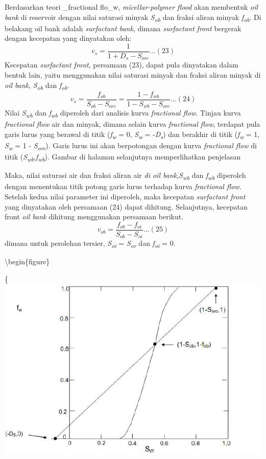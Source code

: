 \documentclass[
]{book}
\begin{document}
Berdasarkan teori \_fractional flo\_w, \emph{micellar-polymer flood} akan membentuk \emph{oil bank} di reservoir dengan nilai saturasi minyak \emph{S\textsubscript{ob}} dan fraksi aliran minyak \emph{f\textsubscript{ob}}. Di belakang oil bank adalah \emph{surfactant bank}, dimana \emph{surfactant front} bergerak dengan kecepatan yang dinyatakan oleh:
\[v_s = \frac{1}{1+D_s-S_{orc}}...(23)\]
Kecepatan \emph{surfactant front}, persamaan (23), dapat pula dinyatakan dalam bentuk lain, yaitu menggunakan nilai saturasi minyak dan fraksi aliran minyak di \emph{oil bank}, \emph{S\textsubscript{ob}} dan \emph{f\textsubscript{ob}}.
\[v_s=\frac{f_{ob}}{S_{ob}-S_{orc}}=\frac{1-f_{wb}}{1-S_{wb}-S_{orc}}...(24)\]
Nilai \emph{S\textsubscript{wb}} dan \emph{f\textsubscript{wb}} diperoleh dari analisis kurva \emph{fractional flow}. Tinjau kurva \emph{fractional flow} air dan minyak, dimana selain kurva \emph{fractional flow}, terdapat pula garis lurus yang berawal di titik (\emph{f\textsubscript{w}} = 0, \emph{S\textsubscript{w}} = -\emph{D\textsubscript{s}}) dan berakhir di titik (\emph{f\textsubscript{w}} = 1, \emph{S\textsubscript{w}} = 1 - \emph{S\textsubscript{orc}}). Garis lurus ini akan berpotongan dengan kurva \emph{fractional flow} di titik (\emph{S\textsubscript{wb}},\emph{f\textsubscript{wb}}). Gambar di halaman selanjutnya memperlihatkan penjelasan

Maka, nilai saturasi air dan fraksi aliran air \emph{di oil bank},\emph{S\textsubscript{wb}} dan \emph{f\textsubscript{wb}} diperoleh dengan menentukan titik potong garis lurus terhadap kurva \emph{fractional flow}. Setelah kedua nilai parameter ini diperoleh, maka kecepatan \emph{surfactant front} yang dinyatakan oleh persamaan (24) dapat dihitung. Selanjutnya, kecepatan front \emph{oil bank} dihitung menggunakan persamaan berikut.
\[v_{ob} = \frac{f_{ob}-f_{oi}}{S_{ob}-S_{oi}}...(25)\]
dimana untuk perolehan tersier, \emph{S\textsubscript{oi}} = \emph{S\textsubscript{or}} dan \emph{f\textsubscript{oi}} = 0.

\textbackslash begin\{figure\}

\{\centering \includegraphics[width=0.5\linewidth]{images/chemical/fractional}
\end{document}
